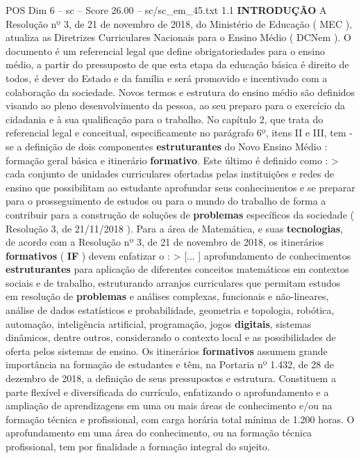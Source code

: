 \begin{textsample}{POS Dim 6 – sc – Score 26.00 – sc/sc\_em\_45.txt}  \label{ex:f6_pos_013}
1.1 \textbf{INTRODUÇÃO} A Resolução nº 3, de 21 de novembro de 2018, do Ministério de Educação ( MEC ), atualiza as Diretrizes Curriculares Nacionais para o Ensino Médio ( DCNem ).
O documento é um referencial legal que define obrigatoriedades para o ensino médio, a partir do pressuposto de que esta etapa da educação básica é direito de todos, é dever do Estado e da família e será promovido e incentivado com a colaboração da sociedade.
Novos termos e estrutura do ensino médio são definidos visando ao pleno desenvolvimento da pessoa, ao seu preparo para o exercício da cidadania e à sua qualificação para o trabalho.
No capítulo 2, que trata do referencial legal e conceitual, especificamente no parágrafo 6º, itens II e III, tem -se a definição de dois componentes \textbf{estruturantes} do Novo Ensino Médio : formação geral básica e itinerário \textbf{formativo}.
Este último é definido como : > cada conjunto de unidades curriculares ofertadas pelas instituições e redes de ensino que possibilitam ao estudante aprofundar seus conhecimentos e se preparar para o prosseguimento de estudos ou para o mundo do trabalho de forma a contribuir para a construção de soluções de \textbf{problemas} específicos da sociedade ( Resolução 3, de 21/11/2018 ).
Para a área de Matemática, e suas \textbf{tecnologias}, de acordo com a Resolução nº 3, de 21 de novembro de 2018, os itinerários \textbf{formativos} ( \textbf{IF} ) devem enfatizar o : > [... ] aprofundamento de conhecimentos \textbf{estruturantes} para aplicação de diferentes conceitos matemáticos em contextos sociais e de trabalho, estruturando arranjos curriculares que permitam estudos em resolução de \textbf{problemas} e análises complexas, funcionais e não-lineares, análise de dados estatísticos e probabilidade, geometria e topologia, robótica, automação, inteligência artificial, programação, jogos \textbf{digitais}, sistemas dinâmicos, dentre outros, considerando o contexto local e as possibilidades de oferta pelos sistemas de ensino.
Os itinerários \textbf{formativos} assumem grande importância na formação de estudantes e têm, na Portaria nº 1.432, de 28 de dezembro de 2018, a definição de seus pressupostos e estrutura.
Constituem a parte flexível e diversificada do currículo, enfatizando o aprofundamento e a ampliação de aprendizagens em uma ou mais áreas de conhecimento e/ou na formação técnica e profissional, com carga horária total mínima de 1.200 horas.
O aprofundamento em uma área do conhecimento, ou na formação técnica profissional, tem por finalidade a formação integral do sujeito.

\end{textsample}
